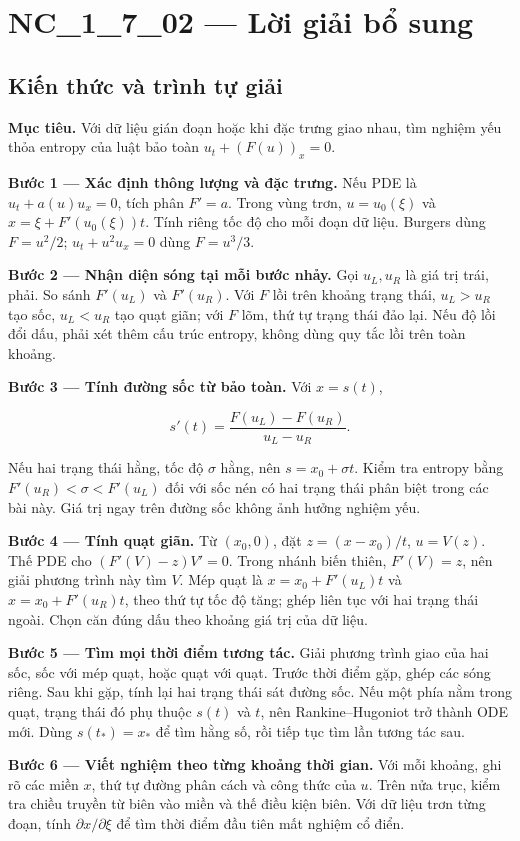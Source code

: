 \documentclass[10pt,a4paper]{article}
\begin{document}
\section*{NC\_1\_7\_02 — Lời giải bổ sung}
\subsection*{Kiến thức và trình tự giải}
\textbf{Mục tiêu.} Với dữ liệu gián đoạn hoặc khi đặc trưng giao nhau, tìm nghiệm yếu thỏa entropy của luật bảo toàn $u_t+(F(u))_x=0$.

\textbf{Bước 1 — Xác định thông lượng và đặc trưng.} Nếu PDE là $u_t+a(u)u_x=0$, tích phân $F'=a$. Trong vùng trơn, $u=u_0(\xi)$ và $x=\xi+F'(u_0(\xi))t$. Tính riêng tốc độ cho mỗi đoạn dữ liệu. Burgers dùng $F=u^2/2$; $u_t+u^2u_x=0$ dùng $F=u^3/3$.

\textbf{Bước 2 — Nhận diện sóng tại mỗi bước nhảy.} Gọi $u_L,u_R$ là giá trị trái, phải. So sánh $F'(u_L)$ và $F'(u_R)$. Với $F$ lồi trên khoảng trạng thái, $u_L>u_R$ tạo sốc, $u_L<u_R$ tạo quạt giãn; với $F$ lõm, thứ tự trạng thái đảo lại. Nếu độ lồi đổi dấu, phải xét thêm cấu trúc entropy, không dùng quy tắc lồi trên toàn khoảng.

\textbf{Bước 3 — Tính đường sốc từ bảo toàn.} Với $x=s(t)$,

\[
s'(t)=\frac{F(u_L)-F(u_R)}{u_L-u_R}.
\]

Nếu hai trạng thái hằng, tốc độ $\sigma$ hằng, nên $s=x_0+\sigma t$. Kiểm tra entropy bằng $F'(u_R)<\sigma<F'(u_L)$ đối với sốc nén có hai trạng thái phân biệt trong các bài này. Giá trị ngay trên đường sốc không ảnh hưởng nghiệm yếu.

\textbf{Bước 4 — Tính quạt giãn.} Từ $(x_0,0)$, đặt $z=(x-x_0)/t$, $u=V(z)$. Thế PDE cho $(F'(V)-z)V'=0$. Trong nhánh biến thiên, $F'(V)=z$, nên giải phương trình này tìm $V$. Mép quạt là $x=x_0+F'(u_L)t$ và $x=x_0+F'(u_R)t$, theo thứ tự tốc độ tăng; ghép liên tục với hai trạng thái ngoài. Chọn căn đúng dấu theo khoảng giá trị của dữ liệu.

\textbf{Bước 5 — Tìm mọi thời điểm tương tác.} Giải phương trình giao của hai sốc, sốc với mép quạt, hoặc quạt với quạt. Trước thời điểm gặp, ghép các sóng riêng. Sau khi gặp, tính lại hai trạng thái sát đường sốc. Nếu một phía nằm trong quạt, trạng thái đó phụ thuộc $s(t)$ và $t$, nên Rankine–Hugoniot trở thành ODE mới. Dùng $s(t_*)=x_*$ để tìm hằng số, rồi tiếp tục tìm lần tương tác sau.

\textbf{Bước 6 — Viết nghiệm theo từng khoảng thời gian.} Với mỗi khoảng, ghi rõ các miền $x$, thứ tự đường phân cách và công thức của $u$. Trên nửa trục, kiểm tra chiều truyền từ biên vào miền và thế điều kiện biên. Với dữ liệu trơn từng đoạn, tính $\partial x/\partial\xi$ để tìm thời điểm đầu tiên mất nghiệm cổ điển.
\end{document}
